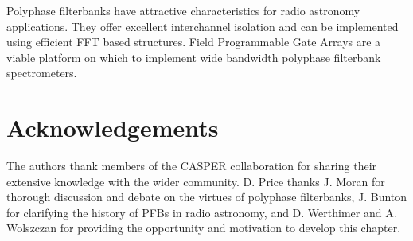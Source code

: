 \documentclass{ws-rv961x669}
\begin{document}
Polyphase filterbanks have attractive characteristics for radio astronomy applications. They offer excellent interchannel isolation and can be implemented using efficient FFT based structures. Field Programmable Gate Arrays are a viable platform on which to implement wide bandwidth polyphase filterbank spectrometers.

\section{Acknowledgements}

The authors thank members of the CASPER collaboration for sharing their extensive knowledge with the wider community. D. Price thanks J. Moran for thorough discussion and debate on the virtues of polyphase filterbanks, J. Bunton for clarifying the history of PFBs in radio astronomy, and D. Werthimer and A. Wolszczan for providing the opportunity and motivation to develop this chapter.



\end{document}
